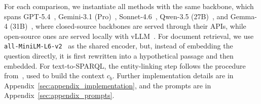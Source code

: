 \documentclass{llmxive}
\begin{document}
For each comparison, we instantiate all methods with the same backbone, which spans GPT-5.4~\citep{GPT-54}, Gemini-3.1 (Pro)~\citep{Gemini31Pro}, Sonnet-4.6~\citep{Sonnet46}, Qwen-3.5 (27B)~\citep{Qwen3.5}, and Gemma-4 (31B)~\citep{Gemma4}, where closed-source backbones are served through their APIs, while open-source ones are served locally with vLLM~\citep{vLLM}. For document retrieval, we use \texttt{all-MiniLM-L6-v2}~\citep{SBERT} as the shared encoder, but, instead of embedding the question directly, it is first rewritten into a hypothetical passage and then embedded. For text-to-SPARQL, the entity-linking step follows the procedure from~\citet{ToG}, used to build the context $c_b$. Further implementation details are in Appendix~\ref{sec:appendix_implementation}, and the prompts are in Appendix~\ref{sec:appendix_prompts}.

\end{document}
